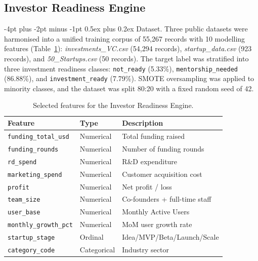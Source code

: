 \documentclass{article}
\makeatletter
\renewcommand\paragraph{\@startsection{paragraph}{4}{\z@}%
  {-4pt plus -2pt minus -1pt}%
  {0.5ex plus 0.2ex}%
  {\normalsize\bf}}
\makeatother
\begin{document}
\FloatBarrier
\subsection{Investor Readiness Engine}
\label{sec:investor}

\paragraph{Dataset.}
Three public datasets were harmonised into a unified training corpus of
55{,}267 records with 10 modelling features (Table~\ref{tab:features}):
\textit{investments\_VC.csv} (54,294 records), \textit{startup\_data.csv}
(923 records), and \textit{50\_Startups.csv} (50 records). The target label
was stratified into three investment readiness classes:
\texttt{not\_ready} (5.33\%), \texttt{mentorship\_needed} (86.88\%), and
\texttt{investment\_ready} (7.79\%). SMOTE oversampling was applied to
minority classes, and the dataset was split 80:20 with a fixed random seed of 42.

\begin{table}[htbp]
\centering
\caption{Selected features for the Investor Readiness Engine.}
\label{tab:features}
\small
\begin{tabular}{lll}
\toprule
\textbf{Feature} & \textbf{Type} & \textbf{Description} \\
\midrule
\texttt{funding\_total\_usd} & Numerical & Total funding raised \\
\texttt{funding\_rounds}     & Numerical & Number of funding rounds \\
\texttt{rd\_spend}           & Numerical & R\&D expenditure \\
\texttt{marketing\_spend}    & Numerical & Customer acquisition cost \\
\texttt{profit}              & Numerical & Net profit / loss \\
\texttt{team\_size}          & Numerical & Co-founders + full-time staff \\
\texttt{user\_base}          & Numerical & Monthly Active Users \\
\texttt{monthly\_growth\_pct}& Numerical & MoM user growth rate \\
\texttt{startup\_stage}      & Ordinal   & Idea/MVP/Beta/Launch/Scale \\
\texttt{category\_code}      & Categorical & Industry sector \\
\bottomrule
\end{tabular}
\end{table}
\end{document}
